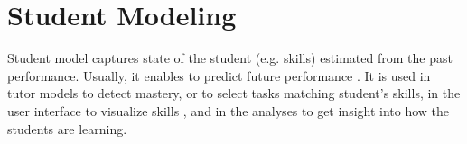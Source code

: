 %



\section{Student Modeling}
\label{sec:student-modeling}

Student model captures state of the student (e.g. skills) estimated from the
past performance. Usually, it enables to predict future performance
\cite{student-models-review-2012, pelanek-learner-modeling,its-learner-models}.
It is used in tutor models to detect mastery, or to select tasks matching
student's skills, in the user interface to visualize skills \cite{instructor-dashboard-realtime},
and in the analyses to get insight into how the students are learning.  %

